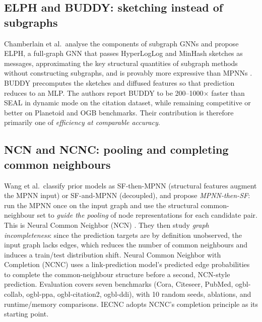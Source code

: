 \documentclass[11pt,a4paper]{article}
\begin{document}
\subsection{ELPH and BUDDY: sketching instead of subgraphs}
Chamberlain et al.\ analyse the components of subgraph GNNs and propose ELPH, a full-graph GNN that passes
HyperLogLog and MinHash sketches as messages, approximating the key structural quantities
of subgraph methods without constructing subgraphs, and is provably more expressive than
MPNNs \cite{chamberlain2023elph}. BUDDY precomputes the sketches and diffused features so
that prediction reduces to an MLP. The authors report BUDDY to be 200--1000$\times$
faster than SEAL in dynamic mode on the citation dataset, while remaining competitive
or better on Planetoid and OGB benchmarks. Their contribution is therefore primarily one of \emph{efficiency at
comparable accuracy}.

\subsection{NCN and NCNC: pooling and completing common neighbours}
Wang et al.\ classify prior models as SF-then-MPNN (structural features augment the MPNN
input) or SF-and-MPNN (decoupled), and propose \emph{MPNN-then-SF}: run the MPNN once on the
input graph and use the structural common-neighbour set to \emph{guide the pooling} of
node representations for each candidate pair. This is Neural Common Neighbor (NCN)
\cite{wang2024ncnc}. They then study \emph{graph incompleteness}: since the prediction targets are
by definition unobserved, the input graph lacks edges, which reduces the number of common neighbours and
induces a train/test distribution shift. Neural Common Neighbor with Completion (NCNC)
uses a link-prediction model's predicted edge probabilities to complete the common-neighbour
structure before a second, NCN-style prediction. Evaluation covers seven benchmarks
(Cora, Citeseer, PubMed, ogbl-collab, ogbl-ppa, ogbl-citation2, ogbl-ddi), with 10 random seeds,
ablations, and runtime/memory comparisons. IECNC adopts NCNC's completion principle
as its starting point.
\end{document}
